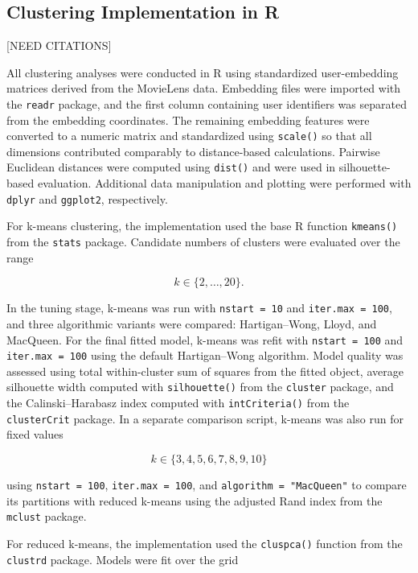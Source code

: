 \documentclass[
  11pt,
]{article}
\begin{document}
\subsection{Clustering Implementation in
R}\label{clustering-implementation-in-r}

{[}NEED CITATIONS{]}

All clustering analyses were conducted in R using standardized
user-embedding matrices derived from the MovieLens data. Embedding files
were imported with the \texttt{readr} package, and the first column
containing user identifiers was separated from the embedding
coordinates. The remaining embedding features were converted to a
numeric matrix and standardized using \texttt{scale()} so that all
dimensions contributed comparably to distance-based calculations.
Pairwise Euclidean distances were computed using \texttt{dist()} and
were used in silhouette-based evaluation. Additional data manipulation
and plotting were performed with \texttt{dplyr} and \texttt{ggplot2},
respectively.

For k-means clustering, the implementation used the base R function
\texttt{kmeans()} from the \texttt{stats} package. Candidate numbers of
clusters were evaluated over the range

\[
k \in \{2,\dots,20\}.
\]

In the tuning stage, k-means was run with \texttt{nstart\ =\ 10} and
\texttt{iter.max\ =\ 100}, and three algorithmic variants were compared:
Hartigan--Wong, Lloyd, and MacQueen. For the final fitted model, k-means
was refit with \texttt{nstart\ =\ 100} and \texttt{iter.max\ =\ 100}
using the default Hartigan--Wong algorithm. Model quality was assessed
using total within-cluster sum of squares from the fitted object,
average silhouette width computed with \texttt{silhouette()} from the
\texttt{cluster} package, and the Calinski--Harabasz index computed with
\texttt{intCriteria()} from the \texttt{clusterCrit} package. In a
separate comparison script, k-means was also run for fixed values

\[
k \in \{3,4,5,6,7,8,9,10\}
\]

using \texttt{nstart\ =\ 100}, \texttt{iter.max\ =\ 100}, and
\texttt{algorithm\ =\ "MacQueen"} to compare its partitions with reduced
k-means using the adjusted Rand index from the \texttt{mclust} package.

For reduced k-means, the implementation used the \texttt{cluspca()}
function from the \texttt{clustrd} package. Models were fit over the
grid
\end{document}
